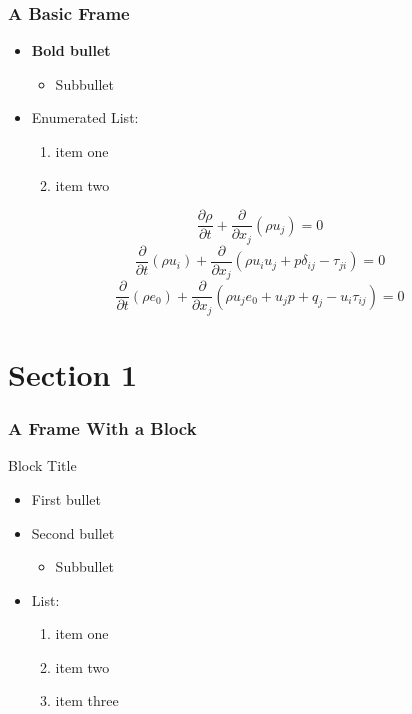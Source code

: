 \documentclass[aspectratio=1610,professionalfonts]{beamer}
\begin{document}
\begin{frame}
  \frametitle{A Basic Frame}

  \begin{itemize}
  \item \textbf{Bold bullet}
    \begin{itemize}
    \item Subbullet
    \end{itemize}
  \item Enumerated List:
    \begin{enumerate}
    \item item one
    \item item two
    \end{enumerate}
  \end{itemize}
  \begin{equation}
    \frac{\partial \rho}{\partial t} +
    \frac{\partial}{\partial x_{j}} (\rho u_{j}) = 0
  \end{equation}
  \begin{equation}
    \frac{\partial}{\partial t} (\rho u_{i}) +
    \frac{\partial}{\partial x_{j}} (\rho u_{i} u_{j} + p \delta_{ij} - \tau_{ji} )
    = 0
  \end{equation}
  \begin{equation}
    \frac{\partial}{\partial t} ( \rho e_{0} ) +
    \frac{\partial}{\partial x_{j}}
    ( \rho u_{j} e_{0} + u_{j} p + q_{j} - u_{i} \tau_{ij} ) = 0
  \end{equation}
\end{frame}

\section{Section 1}
\begin{frame}
  \frametitle{A Frame With a Block}
  \begin{block}{Block Title}
  \begin{itemize}
  \item First bullet
  \item Second bullet
    \begin{itemize}
    \item Subbullet
    \end{itemize}
  \item List:
    \begin{enumerate}
    \item item one
    \item item two
    \item item three
    \end{enumerate}
  \end{itemize}
  \end{block}
\end{frame}
\end{document}
